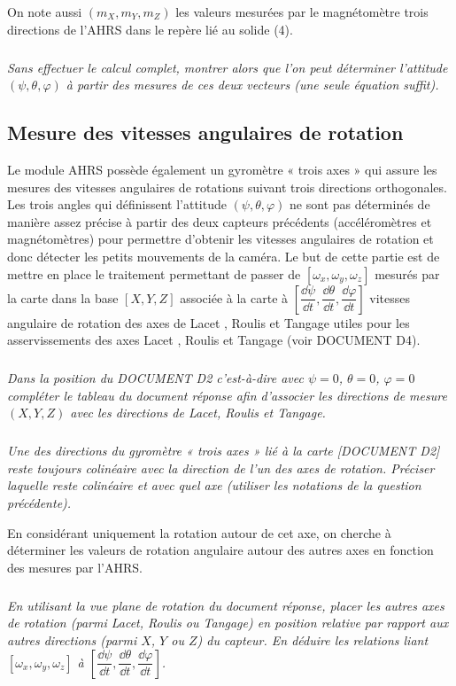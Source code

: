 \documentclass[10pt,fleqn]{article} %
\begin{document}
On note aussi $(m_X, m_Y, m_Z)$ les valeurs mesurées par le magnétomètre trois directions de l’AHRS dans le repère lié au solide (4).

\subparagraph{\label{q15}}\textit{Sans effectuer le calcul complet, montrer alors que l’on peut déterminer l’attitude $(\psi,\theta,\varphi)$ à partir des mesures de ces deux vecteurs (une seule équation suffit).}


\subsection{Mesure des vitesses angulaires de rotation}

Le module AHRS possède également un gyromètre « trois axes » qui assure les mesures des vitesses angulaires de rotations suivant trois directions orthogonales. 
Les trois angles qui définissent l’attitude $(\psi,\theta,\varphi)$ ne sont pas déterminés de manière assez précise à partir des deux capteurs précédents (accéléromètres et magnétomètres) pour permettre d’obtenir les vitesses angulaires de rotation et donc détecter les petits mouvements de la caméra. 
Le but de cette partie est de mettre en place le traitement permettant de passer de $[\omega_x,\omega_y,\omega_z]$  mesurés par la carte dans la base $[X, Y, Z]$ associée à la carte à $\left[ \dfrac{\dd \psi}{\dd t},\dfrac{\dd \theta}{\dd t},\dfrac{\dd \varphi}{\dd t} \right]$ vitesses angulaire de rotation des axes de Lacet , Roulis et Tangage utiles pour les asservissements des axes Lacet , Roulis et Tangage (voir DOCUMENT D4).


\subparagraph{\label{q16}}\textit{Dans la position du DOCUMENT D2 c’est-à-dire avec $\psi=0$, $\theta=0$, $\varphi=0$ compléter le tableau du document réponse afin d’associer les directions de mesure $(X, Y, Z)$ avec les directions de Lacet, Roulis et Tangage.}

\subparagraph{\label{q17}}\textit{Une des directions du gyromètre « trois axes » lié à la carte [DOCUMENT D2] reste toujours colinéaire avec la direction de l’un des axes de rotation. Préciser laquelle reste colinéaire et avec quel axe (utiliser les notations de la question précédente).}

En considérant uniquement la rotation autour de cet axe, on cherche à déterminer les valeurs de rotation angulaire autour des autres axes en fonction des mesures par l’AHRS. 

\subparagraph{\label{q18}}\textit{En utilisant la vue plane de rotation du document réponse, placer les autres axes de rotation (parmi Lacet, Roulis ou Tangage) en position relative par rapport aux autres directions (parmi $X$, $Y$ ou $Z$) du capteur. En déduire les relations liant $[\omega_x,\omega_y,\omega_z]$ à $\left[ \dfrac{\dd \psi}{\dd t},\dfrac{\dd \theta}{\dd t},\dfrac{\dd \varphi}{\dd t} \right]$.}
\end{document}
